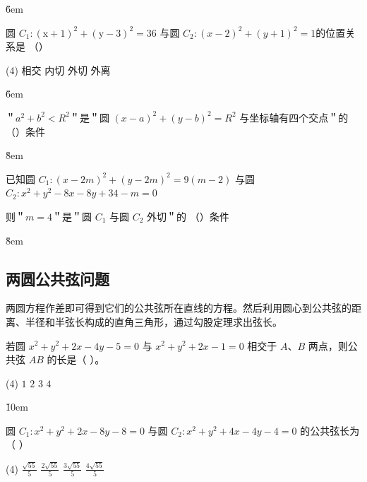 \v{6em}

\begin{example}
    圆 $C_1:(\mathrm{x}+1)^2+(\mathrm{y}-3)^2=36$ 与圆 $C_2:(x-2)^2+(y+1)^2=1$的位置关系是 （\qquad）
    \begin{tasks}(4)
        \task 相交
        \task 内切
        \task 外切
        \task 外离
    \end{tasks}
\end{example}

\v{6em}

\begin{example}
    ＂$a^2+b^2<R^2$＂是＂圆 $(x-a)^2+(y-b)^2=R^2$ 与坐标轴有四个交点＂的 （\qquad）条件
\end{example}

\v{8em}

\begin{example}
    已知圆 $C_1:(x-2 m)^2+(y-2 m)^2=9(m-2)$ 与圆 $C_2: x^2+y^2-8 x-8 y+34-m=0$

    则＂$m=4$＂是＂圆 $C_1$ 与圆 $C_2$ 外切＂的 （\qquad）条件
\end{example}

\v{8em}

\subsection{两圆公共弦问题}

\begin{theorem}[两圆公共弦问题]
    两圆方程作差即可得到它们的公共弦所在直线的方程。然后利用圆心到公共弦的距离、半径和半弦长构成的直角三角形，通过勾股定理求出弦长。
\end{theorem}
\begin{example}
    若圆 $x^2+y^2+2 x-4 y-5=0$ 与 $x^2+y^2+2 x-1=0$ 相交于 $A$、$B$ 两点，则公共弦 $A B$ 的长是（ \hspace{2em} ）。
    \begin{tasks}(4)
        \task $1$
        \task $2$
        \task $3$
        \task $4$
    \end{tasks}
\end{example}

\v{10em}

\begin{example}
    圆 $C_1: x^2+y^2+2 x-8 y-8=0$ 与圆 $C_2: x^2+y^2+4 x-4 y-4=0$ 的公共弦长为（ \hspace{2em} ）
    \begin{tasks}(4)
        \task $\frac{\sqrt{55}}{5}$
        \task $\frac{2 \sqrt{55}}{5}$
        \task $\frac{3 \sqrt{55}}{5}$
        \task $\frac{4 \sqrt{55}}{5}$
    \end{tasks}
\end{example}

